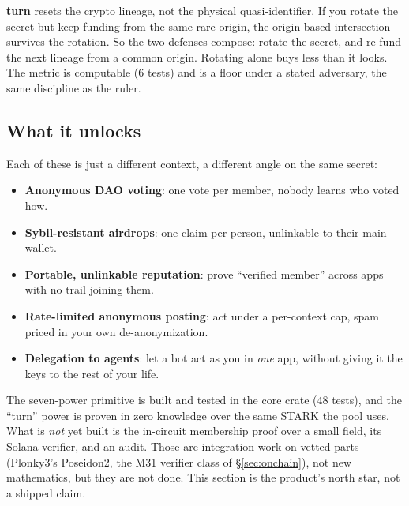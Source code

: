 \documentclass[11pt]{article}
\begin{document}
\begin{honest}
\textbf{turn} resets the crypto lineage, not the physical quasi-identifier. If you
rotate the secret but keep funding from the same rare origin, the origin-based
intersection survives the rotation. So the two defenses compose: rotate the secret, and
re-fund the next lineage from a common origin. Rotating alone buys less than it looks.
The metric is computable ($6$ tests) and is a floor under a stated adversary, the same
discipline as the ruler.
\end{honest}

\subsection{What it unlocks}

Each of these is just a different context, a different angle on the same secret:

\begin{itemize}[leftmargin=1.4em,itemsep=0.15em]
\item \textbf{Anonymous DAO voting}: one vote per member, nobody learns who voted how.
\item \textbf{Sybil-resistant airdrops}: one claim per person, unlinkable to their main
      wallet.
\item \textbf{Portable, unlinkable reputation}: prove ``verified member'' across apps
      with no trail joining them.
\item \textbf{Rate-limited anonymous posting}: act under a per-context cap, spam priced
      in your own de-anonymization.
\item \textbf{Delegation to agents}: let a bot act as you in \emph{one} app, without
      giving it the keys to the rest of your life.
\end{itemize}

\begin{honest}
The seven-power primitive is built and tested in the core crate ($48$ tests), and the
``turn'' power is proven in zero knowledge over the same STARK the pool uses. What is
\emph{not} yet built is the in-circuit membership proof over a small field, its Solana
verifier, and an audit. Those are integration work on vetted parts (Plonky3's Poseidon2,
the M31 verifier class of \S\ref{sec:onchain}), not new mathematics, but they are not
done. This section is the product's north star, not a shipped claim.
\end{honest}

\end{document}
